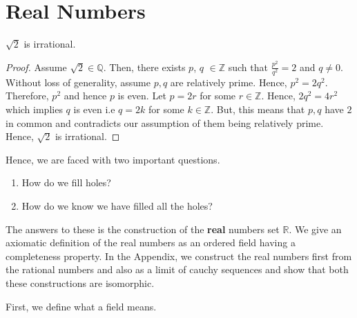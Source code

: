 \chapter{Real Numbers}


\begin{Theorem}[name=Existence of irrational numbers]
	$\sqrt{2}$ is irrational.
\end{Theorem}
\begin{proof}
    
    Assume $\sqrt{2} \in \mathbb{Q}$. Then, there exists $p$, $q$ $\in
    \mathbb{Z}$ such that $ \frac{p^2}{q^2} = 2 $ and $q \neq 0$. 
    Without loss of generality, assume $p,q$ are relatively prime.
    Hence, $p^2 = 2q^2$. Therefore, $p^2$ and hence $p$ is even.
    Let $p = 2r$ for some $r \in \mathbb{Z}$. Hence, $2q^2 = 4r^2$ which
    implies $q$ is even i.e $q = 2k$ for some $k \in \mathbb{Z}$. But, this
    means that $p,q$ have $2$ in common and contradicts our assumption of
    them being relatively prime. Hence, $\sqrt{2}$ is irrational.
\end{proof}

Hence, we are faced with two important questions.
\begin{enumerate}
	\item How do we fill holes?
	\item How do we know we have filled all the holes?
\end{enumerate}
The answers to these is the construction of the \textbf{real} numbers set
$\mathbb{R}$. We give an axiomatic definition of the real numbers as an ordered field having a completeness
property. In the Appendix, we construct the real numbers first from the rational numbers and also as a limit
of cauchy sequences and show that both these constructions are isomorphic.

First, we define what a field means.

